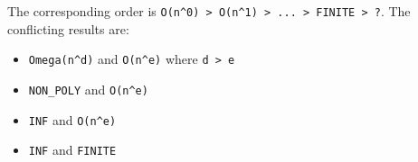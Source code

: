 %
The corresponding order is \texttt{O(n\textasciicircum 0) > O(n\textasciicircum 1) > ... > FINITE > ?}.
%
The conflicting results are:
\begin{itemize}
\item \texttt{Omega(n\textasciicircum d)} and \texttt{O(n\textasciicircum e)} where \texttt{d > e}
\item \texttt{NON\_POLY} and \texttt{O(n\textasciicircum e)}
\item \texttt{INF} and \texttt{O(n\textasciicircum e)}
\item \texttt{INF} and \texttt{FINITE}
\end{itemize}
